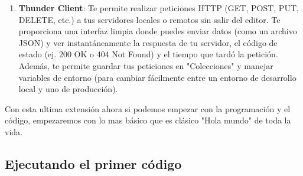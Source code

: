 \begin{enumerate}
\begin{itemize}
		\item \textbf{Spring Boot Dashboard}: Agrega un panel a la barra lateral de VS Code (un icono de una hojita, símbolo de Spring). Desde ahí, puedes ver todos los proyectos de Spring Boot que tienes en tu entorno de trabajo. Con simples botones interactivos puedes arrancar (Run), detener o depurar (Debug) cada servidor de forma independiente. Además, una vez que la aplicación está corriendo, el panel te mapea y te muestra todas las rutas REST (URLs de tus endpoints) que están activas para que sepas exactamente qué servicios levantaste.
	\end{itemize}
	\item \textbf{Thunder Client}: Te permite realizar peticiones HTTP (GET, POST, PUT, DELETE, etc.) a tus servidores locales o remotos sin salir del editor. Te proporciona una interfaz limpia donde puedes enviar datos (como un archivo JSON) y ver instantáneamente la respuesta de tu servidor, el código de estado (ej. 200 OK o 404 Not Found) y el tiempo que tardó la petición. Además, te permite guardar tus peticiones en "Colecciones" y manejar variables de entorno (para cambiar fácilmente entre un entorno de desarrollo local y uno de producción).
\end{enumerate}
Con esta ultima extensión ahora si podemos empezar con la programación y el código, empezaremos con lo mas básico que es clásico "Hola mundo" de toda la vida.
\subsection{Ejecutando el primer código}
